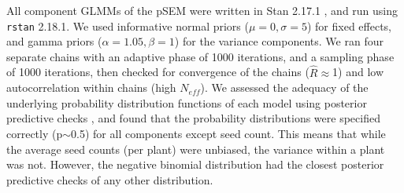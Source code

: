 \documentclass[12pt, draft]{article} %
\begin{document}

All component GLMMs of the pSEM were written in Stan 2.17.1 \citep{gelman2015}, and run using \texttt{rstan} 2.18.1.
We used informative normal priors ($\mu=0, \sigma=5$) for fixed effects, and gamma priors ($\alpha=1.05, \beta=1$) for the variance components.
We ran four separate chains with an adaptive phase of 1000 iterations, and a sampling phase of 1000 iterations, then checked for convergence of the chains ($\hat{R} \approx$1) and low autocorrelation within chains (high $N_{eff}$).
We assessed the adequacy of the underlying probability distribution functions of each model using posterior predictive checks \citep{gelman2013}, and found that the probability distributions were specified correctly (p$\sim$0.5) for all components except seed count.
This means that while the average seed counts (per plant) were unbiased, the variance within a plant was not. 
However, the negative binomial distribution had the closest posterior predictive checks of any other distribution. 
\end{document}
